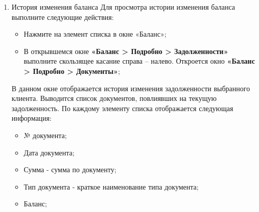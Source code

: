 \begin{enumerate}[\thesection .1]
\begin{figure}[!h]
\end{figure}
По каждому элементу списка отображается следующая информация:\footnote{Если дата оплаты документа-задолженности равна текущей дате, то номера таких документов выделяются в списке желтым цветом. Если дата оплаты документа меньше текущей даты, то номера таких документов выделяются в списке красным цветом. Остальные номера документов выделяются белым цветом.} 
\begin{itemize}
	\item № документа;
	\item Дата отгрузки – дата, на которую планируется отгрузка продукции по документу;
	\item Дата оплаты – дата, до которой клиент должен внести оплату;
	\item Клиент - наименование клиента, для которого зафиксирована задолженность;
	\item Тип оплаты – тип оплаты документа;
	\item Тип документа - тип документа, по которому зафиксирована задолженность;	
	\item Сумма документа – сумма, на которую был отгружен товар;
	\item Задолженность - сумма задолженности;	
\end{itemize}
\item История изменения баланса
Для просмотра истории изменения баланса выполните следующие действия: 
\begin{itemize}
	\item Нажмите на элемент списка в окне «Баланс»;
	\item В открывшемся окне \textbf{«Баланс > Подробно > Задолженности»} выполните скользящее касание справа – налево. Откроется окно \textbf{«Баланс > Подробно > Документы»};
\end{itemize}
В данном окне отображается история изменения задолженности выбранного клиента. Выводится список документов, повлиявших на текущую задолженность. По каждому элементу списка отображается следующая информация: 
\begin{itemize}
	\item № документа;
	\item Дата документа;
	\item Сумма - сумма по документу;
	\item Тип документа - краткое наименование типа документа;
	\item Баланс;	
\end{itemize}

\end{enumerate}
